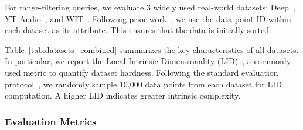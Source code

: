 \documentclass[sigconf, nonacm]{acmart}
\begin{document}
For range-filtering queries, we evaluate 3 widely used real-world datasets: Deep~\cite{yandex_deep_dataset}, YT-Audio~\cite{youtube8m_dataset}, and WIT~\cite{wit_dataset}. Following prior work~\cite{DSG}, we use the data point ID within each dataset as its attribute. This ensures that the data is initially sorted.

Table~\ref{tab:datasets_combined} summarizes the key characteristics of all datasets. In particular, we report the Local Intrinsic Dimensionality (LID)~\cite{Lid}, a commonly used metric to quantify dataset hardness. Following the standard evaluation protocol~\cite{LID2}, we randomly sample 10,000 data points from each dataset for LID computation. A higher LID indicates greater intrinsic complexity.

\setlength{\textfloatsep}{0.1cm}
\setlength{\floatsep}{0cm}
\begin{table}[t]
\centering

\setlength{\abovecaptionskip}{0.05cm}
\setlength{\textfloatsep}{0.cm}
\caption{Datassets}

\label{tab:datasets_combined}
\end{table}



\subsubsection{Evaluation Metrics}
\end{document}
